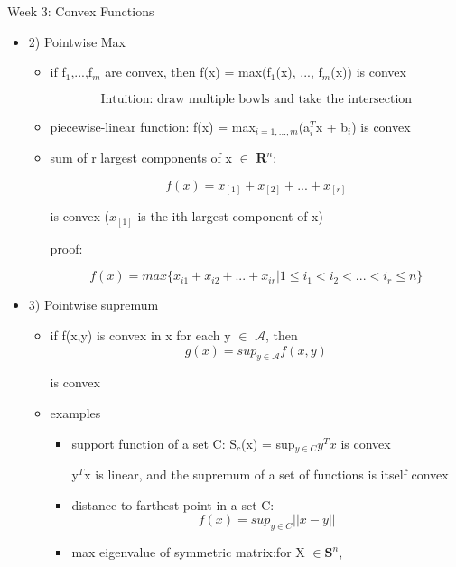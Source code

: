 \documentclass{article}
\begin{document}
\begin{homeworkProblemName}{{\LARGE Week 3: Convex Functions}}
\begin{problemAnswer}
{\begin{itemize}
\begin{itemize}
\begin{itemize}
        \item (any) norm of affine function: f(x) = $|| Ax + b|| $
        \end{itemize}

      \item 2) Pointwise Max

        \begin{itemize}
        \item  if f$_1$,...,f$_m$ are convex, then f(x) = max(f$_1$(x), ..., f$_m$(x)) is
          convex

          $$ \text{Intuition: draw multiple bowls and take the intersection} $$

        \item piecewise-linear function: f(x) = max$_{i=1,...,m}$(a$_i^T$x +
          b$_i$) is convex
        \item sum of r largest components of x $\in$ $\bm{R}^n$:

          $$ f(x) = x_{[1]} + x_{[2]} + ... + x_{[r]}$$

          is convex ($x_{[1]}$ is the ith largest component of x)

          proof:

          $$ f(x) = max\{x_{i1} + x_{i2} + ... + x_{ir} | 1 \leq i_1 < i_2 < ... <
          i_r \leq n \}$$
        \end{itemize}

      \item 3) Pointwise supremum

        \begin{itemize}
        \item if f(x,y) is convex in x for each y $\in$ $\mathcal{A}$, then
          $$ g(x) = sup_{y \in \mathcal{A}} f(x,y) $$

          is convex

        \item examples

          \begin{itemize}
            \item support function of a set C: S$_c$(x) = sup$_{y \in C} y^Tx$ is
              convex

              y$^T$x is linear, and the supremum of a set of functions is itself convex
            \item distance to farthest point in a set C:
              $$ f(x) = sup_{y \in C} || x - y || $$
            \item max eigenvalue of symmetric matrix:for X $\in \bm{S}^n$,


\end{itemize}
\end{itemize}
\end{itemize}
\end{itemize}}
\end{problemAnswer}
\end{homeworkProblemName}
\end{document}
